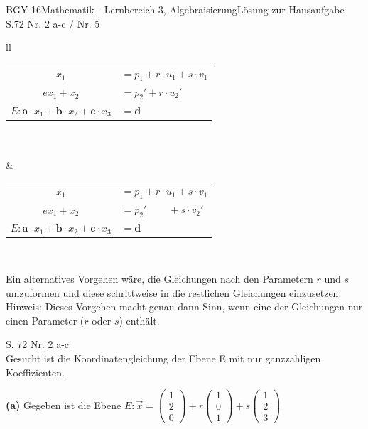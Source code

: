 \documentclass[oneside,openany,headings=optiontotoc,11pt,numbers=noenddot]{scrreprt}
\begin{document}
\begin{worksheet}{BGY 16}{Mathematik - Lernbereich 3, Algebraisierung}{Lösung zur Hausaufgabe S.72 Nr. 2 a-c / Nr. 5}
\begin{framed}
\begin{tabular}{ll}
				\begin{tabularx}{0.4\textwidth}{cl}
					\(x_1\) & \(= p_1 + r\cdot{}u_1 + s\cdot{}v_1\)\\
					\(ex_1 + x_2\) & \(= p_2' + r\cdot u_2'\) \\
					\(E: \mathbf{a}\cdot x_1 + \mathbf{b}\cdot x_2 + \mathbf{c}\cdot x_3\) & \(= \mathbf{d}\)\\
				\end{tabularx}\\
				\multicolumn{2}{c}{oder}\\
				& \begin{tabularx}{0.5\textwidth}{cl}
					\(x_1\) & \(= p_1 + r\cdot{}u_1 + s\cdot{}v_1\)\\
					\(ex_1 + x_2\) & \(= p_2'\ \ \ \ \ \ \ \ \ \  + s\cdot v_2'\)\\
					\(E: \mathbf{a}\cdot x_1 + \mathbf{b}\cdot x_2 + \mathbf{c}\cdot x_3\) & \(= \mathbf{d}\)
				\end{tabularx}
			\end{tabular}\\
			\par\noindent
			Ein alternatives Vorgehen wäre, die Gleichungen nach den Parametern \(r\) und \(s\) umzuformen und diese schrittweise in die restlichen Gleichungen einzusetzen.\\
			\tiny{Hinweis: Dieses Vorgehen macht genau dann Sinn, wenn eine der Gleichungen nur einen Parameter (\(r\) oder \(s\)) enthält.}\normalsize
		\end{framed}		
		\begin{framed}
			\noindent
			\tiny{\color{codegray}\underline{S. 72 Nr. 2 a-c}}\\
			\normalsize\noindent
			Gesucht ist die Koordinatengleichung der Ebene E mit nur ganzzahligen Koeffizienten.\\
			\par
			\textbf{(a)} Gegeben ist die Ebene \(E:\vec{x} = \left(\begin{array}{c}1\\2\\0\end{array}\right) + r\left(\begin{array}{c}1\\0\\1\end{array}\right) + s\left(\begin{array}{c}1\\2\\3\end{array}\right)\)\\

\end{framed}
\end{worksheet}
\end{document}
